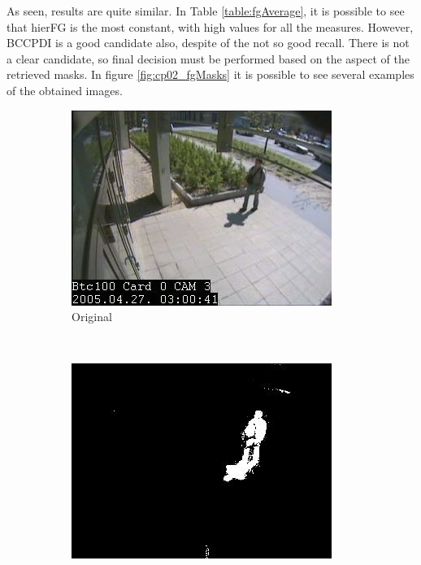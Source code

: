 As seen, results are quite similar. In Table \ref{table:fgAverage}, it is possible to see that hierFG is the most 
constant, with high values for all the measures. However, BCCPDI is a good candidate also, despite of the not so good 
recall. There is not a clear candidate, so final decision must be performed based on the aspect of the retrieved masks. 
In figure \ref{fig:cp02_fgMasks} it is possible to see several examples of the obtained images.

\begin{figure}
        \centering
        \begin{subfigure}[b]{0.19\textwidth}
                \centering
                \includegraphics[width=\textwidth]{fig13.jpg}
                \caption{Original}
                \label{fig:cp02_originalMask}
        \end{subfigure}%
        ~ %
        \begin{subfigure}[b]{0.19\textwidth}
                \centering
                \includegraphics[width=\textwidth]{fig14.jpg}

\end{subfigure}
\end{figure}
